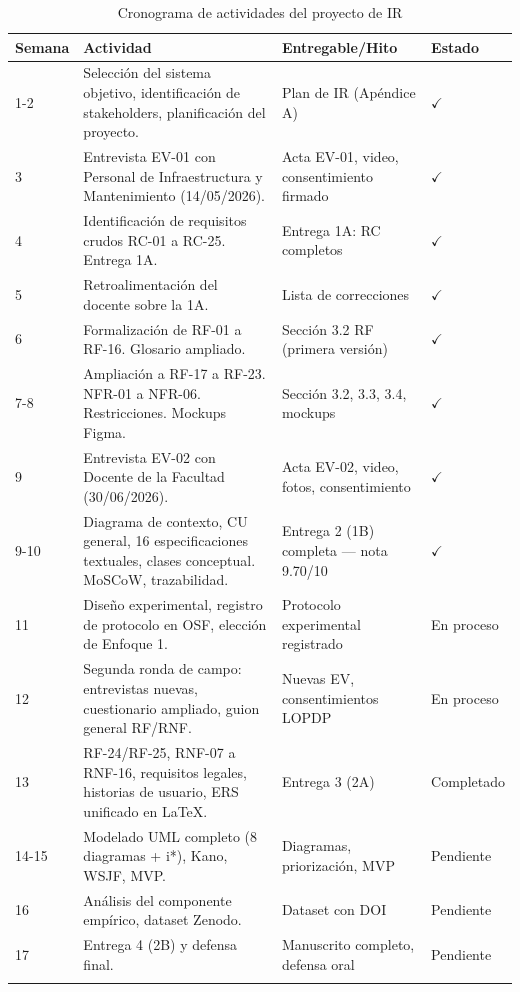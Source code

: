 \begingroup
\small
\begin{longtable}{|p{3.9cm}|p{3.9cm}|p{3.9cm}|p{3.9cm}|}
\hline
Semana & Actividad & Entregable/Hito & Estado \\ \hline
1-2 & Selección del sistema objetivo, identificación de stakeholders, planificación del proyecto. & Plan de IR (Apéndice A) & $\checkmark$ \\ \hline
3 & Entrevista EV-01 con Personal de Infraestructura y Mantenimiento (14/05/2026). & Acta EV-01, video, consentimiento firmado & $\checkmark$ \\ \hline
4 & Identificación de requisitos crudos RC-01 a RC-25. Entrega 1A. & Entrega 1A: RC completos & $\checkmark$ \\ \hline
5 & Retroalimentación del docente sobre la 1A. & Lista de correcciones & $\checkmark$ \\ \hline
6 & Formalización de RF-01 a RF-16. Glosario ampliado. & Sección 3.2 RF (primera versión) & $\checkmark$ \\ \hline
7-8 & Ampliación a RF-17 a RF-23. NFR-01 a NFR-06. Restricciones. Mockups Figma. & Sección 3.2, 3.3, 3.4, mockups & $\checkmark$ \\ \hline
9 & Entrevista EV-02 con Docente de la Facultad (30/06/2026). & Acta EV-02, video, fotos, consentimiento & $\checkmark$ \\ \hline
9-10 & Diagrama de contexto, CU general, 16 especificaciones textuales, clases conceptual. MoSCoW, trazabilidad. & Entrega 2 (1B) completa --- nota 9.70/10 & $\checkmark$ \\ \hline
11 & Diseño experimental, registro de protocolo en OSF, elección de Enfoque 1. & Protocolo experimental registrado & En proceso \\ \hline
12 & Segunda ronda de campo: entrevistas nuevas, cuestionario ampliado, guion general RF/RNF. & Nuevas EV, consentimientos LOPDP & En proceso \\ \hline
13 & RF-24/RF-25, RNF-07 a RNF-16, requisitos legales, historias de usuario, ERS unificado en LaTeX. & Entrega 3 (2A) & Completado \\ \hline
14-15 & Modelado UML completo (8 diagramas + i*), Kano, WSJF, MVP. & Diagramas, priorización, MVP & Pendiente \\ \hline
16 & Análisis del componente empírico, dataset Zenodo. & Dataset con DOI & Pendiente \\ \hline
17 & Entrega 4 (2B) y defensa final. & Manuscrito completo, defensa oral & Pendiente \\ \hline
\caption{Cronograma de actividades del proyecto de IR}
\end{longtable}
\endgroup

